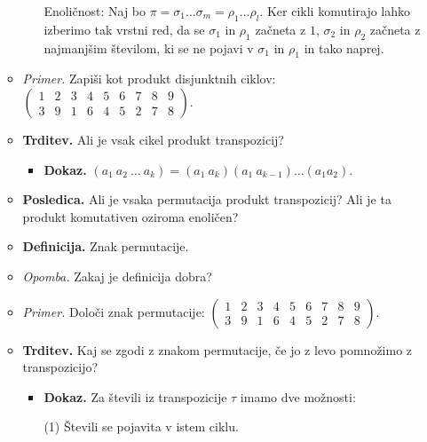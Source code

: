 \begin{enumerate}
\begin{itemize}
\begin{itemize}
            Enoličnost: Naj bo $\pi = \sigma_1 \ldots \sigma_m = \rho_1 \ldots \rho_l$. Ker cikli komutirajo lahko izberimo tak vrstni red, da se $\sigma_1$ in $\rho_1$ začneta z $1$, $\sigma_2$ in $\rho_2$ začneta z najmanjšim številom, ki se ne pojavi v $\sigma_1$ in $\rho_1$ in tako naprej.
        \end{itemize}
        \item \colorbox{yellow!30}{\emph{Primer.}} Zapiši kot produkt disjunktnih ciklov: $ \begin{pmatrix}
            1 & 2 & 3 & 4 & 5 & 6 & 7 & 8 & 9 \\
            3 & 9 & 1 & 6 & 4 & 5 & 2 & 7 & 8 
            \end{pmatrix}  $.
        \item \colorbox{blue!30}{\textbf{Trditev.}} Ali je vsak cikel produkt transpozicij?
        \begin{itemize}
            \item \colorbox{green!30}{\textbf{Dokaz.}} $(a_1 \ a_2 \ \ldots \ a_k) = (a_1 \ a_k)(a_1 \ a_{k-1}) \ldots (a_1 a_2)$.
        \end{itemize}
        \item \colorbox{orange!30}{\textbf{Posledica.}} Ali je vsaka permutacija produkt transpozicij? Ali je ta produkt komutativen oziroma enoličen?
        
        \newpage
        \item \colorbox{purple!30}{\textbf{Definicija.}} Znak permutacije.
        \item \colorbox{yellow!30}{\emph{Opomba.}} Zakaj je definicija dobra?
        \item \colorbox{yellow!30}{\emph{Primer.}} Določi znak permutacije: $ \begin{pmatrix}
            1 & 2 & 3 & 4 & 5 & 6 & 7 & 8 & 9 \\
            3 & 9 & 1 & 6 & 4 & 5 & 2 & 7 & 8 
            \end{pmatrix}  $.
        \item \colorbox{blue!30}{\textbf{Trditev.}} Kaj se zgodi z znakom permutacije, če jo z levo pomnožimo z transpozicijo?
        \begin{itemize}
            \item \colorbox{green!30}{\textbf{Dokaz.}} Za števili iz transpozicije $\tau$ imamo dve možnosti:
            
            (1) Števili se pojavita v istem ciklu.


\end{itemize}
\end{itemize}
\end{enumerate}
